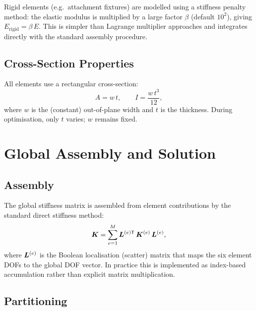 Rigid elements (e.g.\ attachment fixtures) are modelled using a stiffness
penalty method: the elastic modulus is multiplied by a large factor
$\beta$ (default $10^2$), giving $E_{\text{rigid}} = \beta\, E$.  This
is simpler than Lagrange multiplier approaches and integrates directly
with the standard assembly procedure.

\subsection{Cross-Section Properties}

All elements use a rectangular cross-section:
%
\begin{equation}
    A = w\,t, \qquad I = \frac{w\,t^3}{12},
\end{equation}
%
where $w$ is the (constant) out-of-plane width and $t$ is the thickness.
During optimisation, only $t$ varies; $w$ remains fixed.

\section{Global Assembly and Solution}
\label{sec:assembly}

\subsection{Assembly}

The global stiffness matrix is assembled from element contributions by
the standard direct stiffness method:
%
\begin{equation}
    \bm{K} = \sum_{e=1}^{M} \bm{L}^{(e)\mathsf{T}}\, \bm{K}^{(e)}\, \bm{L}^{(e)},
\end{equation}
%
where $\bm{L}^{(e)}$ is the Boolean localisation (scatter) matrix that maps
the six element DOFs to the global DOF vector.  In practice this is
implemented as index-based accumulation rather than explicit matrix
multiplication.

\subsection{Partitioning}

